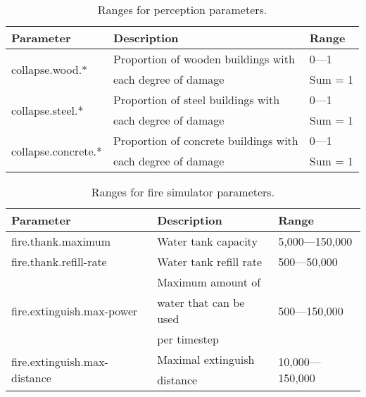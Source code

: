 \documentclass{article}
\begin{document}
\begin{table}[htb]
\caption{Ranges for perception parameters.}
\label{tab:9}
\centering
\begin{tabular}{lll}
  \hline
  \textbf{Parameter}                    & \textbf{Description}                 
  & \textbf{Range}\\
  \hline
  \multirow{2}{*}{collapse.wood.*}      & Proportion of wooden buildings with  
  & 0---1\\
                                        & each degree of damage                
  & Sum = 1\\
  \hline
  \multirow{2}{*}{collapse.steel.*}     & Proportion of steel buildings with   
  & 0---1\\
                                        & each degree of damage                
  & Sum = 1\\
  \hline
  \multirow{2}{*}{collapse.concrete.*}  & Proportion of concrete buildings with
  & 0---1\\
                                        & each degree of damage                
  & Sum = 1\\
  \hline
\end{tabular}
\end{table}

\begin{table}[htb]
\caption{Ranges for fire simulator parameters.}
\label{tab:10}
\centering
\begin{tabular}{lll}
  \hline
  \textbf{Parameter}                            & \textbf{Description}    & 
  \textbf{Range}\\
  \hline
  fire.thank.maximum                            & Water tank capacity     & 
  5,000---150,000\\
  \hline
  fire.thank.refill-rate                        & Water tank refill rate  & 
  500---50,000\\
  \hline
  \multirow{3}{*}{fire.extinguish.max-power}    & Maximum amount of       & 
  \multirow{3}{*}{500---150,000}\\
                                                & water that can be used  & \\
                                                & per timestep            & \\
  \hline
  \multirow{2}{*}{fire.extinguish.max-distance} & Maximal extinguish      & 
  \multirow{2}{*}{10,000---150,000}\\
                                                & distance                & \\
  \hline
\end{tabular}
\end{table}
\end{document}
